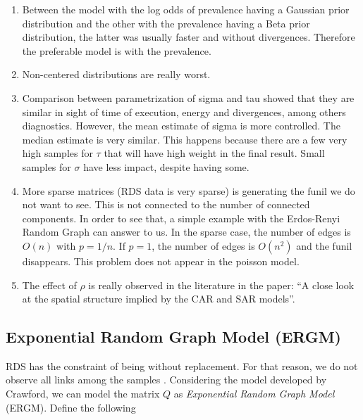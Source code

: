\begin{enumerate}
  \item Between the model with the log odds of prevalence having a Gaussian prior
  distribution and the other with the prevalence having a Beta prior
  distribution, 
  the latter was usually faster and without divergences. Therefore the 
  preferable model is with the prevalence. 

  \item Non-centered distributions are really worst. 
  \item Comparison between parametrization of sigma and tau showed that
  they are similar in sight of time of execution, energy and divergences,
  among others diagnostics. However, the mean estimate of sigma is more
  controlled. The median estimate is very similar. This happens because there
  are a few very high samples for $\tau$ that will have high weight in the
  final result. Small samples for $\sigma$ have less impact, despite having
  some. 
  \item More sparse matrices (RDS data is very sparse) is generating the funil
  we do not want to see. This is not connected to the number of connected
  components. In order to see that, a simple example with the Erdos-Renyi
  Random Graph can answer to us. In the sparse case, the number of edges is
  $O(n)$ with $p=1/n$. If $p=1$, the number of edges is $O(n^2)$ and the funil
  disappears. This problem does not appear in the poisson model. 

  \item The effect of $\rho$ is really observed in the literature in the
  paper: ``A close look at the spatial structure implied by the CAR and SAR
  models''. 
\end{enumerate}

\subsection{Exponential Random Graph Model (ERGM)}

RDS has the constraint of being without replacement. For that reason, we do
not observe all links among the samples \cite[]{crawford2016}. Considering the
model developed by Crawford, we can model the
matrix $Q$ as {\em Exponential Random Graph Model} (ERGM). Define the
following 

